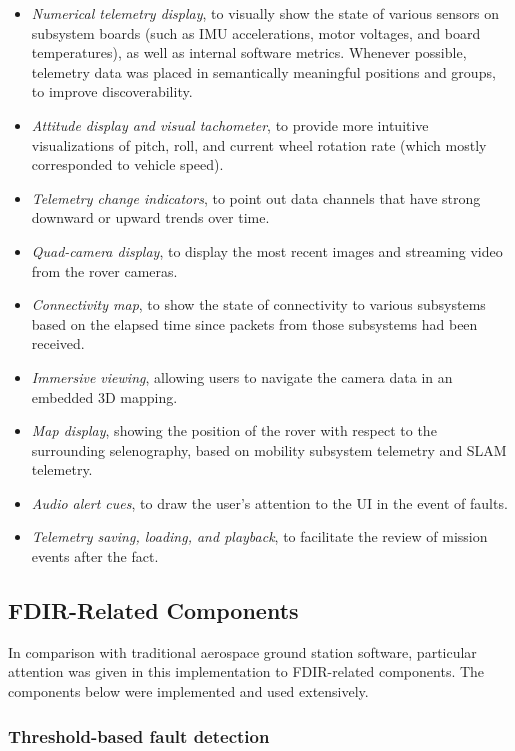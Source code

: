 \begin{itemize}
    \item \textit{Numerical telemetry display}, to visually show the state of various sensors on subsystem boards (such as IMU accelerations, motor voltages, and board temperatures), as well as internal software metrics. Whenever possible, telemetry data was placed in semantically meaningful positions and groups, to improve discoverability.
    \item \textit{Attitude display and visual tachometer}, to provide more intuitive visualizations of pitch, roll, and current wheel rotation rate (which mostly corresponded to vehicle speed).
    \item \textit{Telemetry change indicators}, to point out data channels that have strong downward or upward trends over time.
    \item \textit{Quad-camera display}, to display the most recent images and streaming video from the rover cameras.
    \item \textit{Connectivity map}, to show the state of connectivity to various subsystems based on the elapsed time since packets from those subsystems had been received.
    \item \textit{Immersive viewing}, allowing users to navigate the camera data in an embedded 3D mapping.
    \item \textit{Map display}, showing the position of the rover with respect to the surrounding selenography, based on mobility subsystem telemetry and SLAM telemetry.
    \item \textit{Audio alert cues}, to draw the user's attention to the UI in the event of faults.
    \item \textit{Telemetry saving, loading, and playback}, to facilitate the review of mission events after the fact.
\end{itemize}

\subsection{FDIR-Related Components}

In comparison with traditional aerospace ground station software, particular attention was given in this implementation to FDIR-related components. The components below were implemented and used extensively.

\subsubsection{Threshold-based fault detection}


